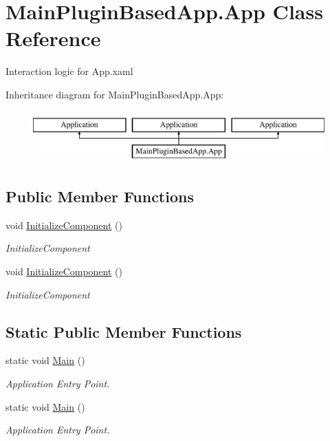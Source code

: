 \hypertarget{class_main_plugin_based_app_1_1_app}{}\section{Main\+Plugin\+Based\+App.\+App Class Reference}
\label{class_main_plugin_based_app_1_1_app}


Interaction logic for App.\+xaml  


Inheritance diagram for Main\+Plugin\+Based\+App.\+App\+:\begin{figure}[H]
\begin{center}
\leavevmode
\includegraphics[height=2.000000cm]{dc/d6b/class_main_plugin_based_app_1_1_app}
\end{center}
\end{figure}
\subsection*{Public Member Functions}
\begin{DoxyCompactItemize}
\item 
void \mbox{\hyperlink{class_main_plugin_based_app_1_1_app_ac902c59dec8e2316d5e4b42dd0ef4808}{Initialize\+Component}} ()
\begin{DoxyCompactList}\small\item\em Initialize\+Component \end{DoxyCompactList}\item 
void \mbox{\hyperlink{class_main_plugin_based_app_1_1_app_ac902c59dec8e2316d5e4b42dd0ef4808}{Initialize\+Component}} ()
\begin{DoxyCompactList}\small\item\em Initialize\+Component \end{DoxyCompactList}\end{DoxyCompactItemize}
\subsection*{Static Public Member Functions}
\begin{DoxyCompactItemize}
\item 
static void \mbox{\hyperlink{class_main_plugin_based_app_1_1_app_ac30ebe1741c7bd7c33a7ffff519403f1}{Main}} ()
\begin{DoxyCompactList}\small\item\em Application Entry Point. \end{DoxyCompactList}\item 
static void \mbox{\hyperlink{class_main_plugin_based_app_1_1_app_ac30ebe1741c7bd7c33a7ffff519403f1}{Main}} ()
\begin{DoxyCompactList}\small\item\em Application Entry Point. \end{DoxyCompactList}\end{DoxyCompactItemize}


